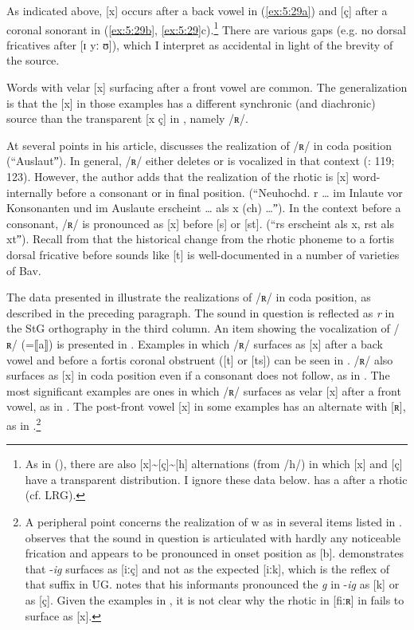 As indicated above, [x] occurs after a back vowel in (\ref{ex:5:29a}) and [ç] after a coronal sonorant in (\ref{ex:5:29b}, \ref{ex:5:29}c).\footnote{{As in  (), there are also [x]{\textasciitilde}[ç]{\textasciitilde}[h] alternations (from /h/) in which [x] and [ç] have a transparent distribution. I ignore these data below.  has a  after a rhotic (cf. LRG).} } There are various gaps (e.g. no dorsal fricatives after [ɪ yː ʊ]), which I interpret as accidental in light of the brevity of the source.\largerpage[2]

Words with velar [x] surfacing after a front vowel are common. The generalization is that the [x] in those examples has a different synchronic (and diachronic) source than the transparent [x ç] in , namely /ʀ/.

At several points in his article, \citet{Siebs1906} discusses the realization of /ʀ/ in coda position (“Auslautˮ). In general, /ʀ/ either deletes or is vocalized in that context (\citealt{Siebs1906}: 119; 123). However, the author adds that the realization of the rhotic is [x] word-internally before a consonant or in final position. (“Neuhochd. r … im Inlaute vor Konsonanten und im Auslaute erscheint … als x (ch) …ˮ). In the context before a consonant, /ʀ/ is pronounced as [x] before [s] or [st]. (“rs erscheint als x, rst als xtˮ). Recall from  that the historical change from the rhotic phoneme to a fortis dorsal fricative before sounds like [t] is well-documented in a number of varieties of Bav.

The data presented in  illustrate the realizations of /ʀ/ in coda position, as described in the preceding paragraph. The sound in question is reflected as \textit{r} in the StG orthography in the third column. An item showing the vocalization of /ʀ/ (=⟦a⟧) is presented in . Examples in which /ʀ/ surfaces as [x] after a back vowel and before a fortis coronal obstruent ([t] or [ts]) can be seen in .  /ʀ/ also surfaces as [x] in coda position even if a consonant does not follow, as in . The most significant examples are ones in which /ʀ/ surfaces as velar [x] after a front vowel, as in . The post-front vowel [x] in some examples has an alternate with [ʀ], as in .\footnote{{A peripheral point concerns the realization of w as in several items listed in . \citet[109]{Siebs1906} observes that the sound in question is articulated with hardly any noticeable frication and appears to be pronounced in onset position as [b].  demonstrates that -}\textrm{\textit{ig}} \textrm{surfaces as [iːç] and not as the expected [iːk], which is the reflex of that suffix in UG. \citet[124]{Siebs1906} notes that his informants pronounced the} \textrm{\textit{g}} \textrm{in -}\textrm{\textit{ig}} \textrm{as [k] or as [ç]. Given the examples in , it is not clear why the rhotic in [fiːʀ] in  fails to surface as [x].} }

